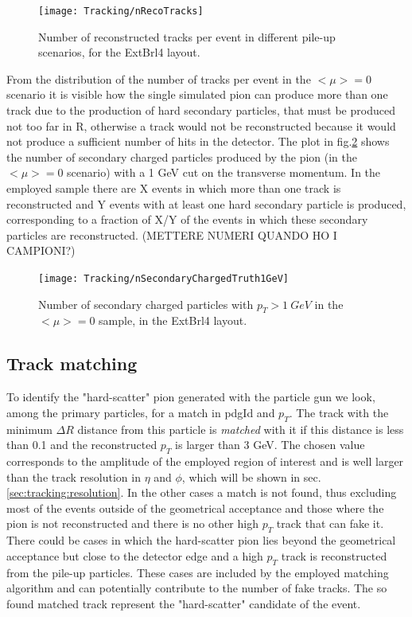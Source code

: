 \documentclass[a4paper,twoside,12pt]{article}
\begin{document}
\begin{figure}
\centering
\texttt{[image: Tracking/nRecoTracks]}
\caption{Number of reconstructed tracks per event in different pile-up scenarios, for the ExtBrl4 layout.}
\label{fig:tracking:nRecoTracks}
\end{figure}

From the distribution of the number of tracks per event in the $<\mu> = 0$ scenario it is visible
how the single simulated pion can produce more than one track due to the production of hard secondary particles, that must be produced not too far in R, otherwise a track would
not be reconstructed because it would not produce a sufficient number of hits in the detector. The plot in fig.\ref{fig:tracking:nSecondaryChargedTruth1GeV} shows the number of secondary charged particles produced by the pion (in the $<\mu> = 0$ scenario)
with a 1 GeV cut on the transverse momentum. In the employed sample there are X events in which more than one track is reconstructed and Y events with at least one hard secondary 
particle is produced, corresponding to a fraction of X/Y of the events in which these secondary particles are reconstructed. (METTERE NUMERI QUANDO HO I CAMPIONI?)

\begin{figure}
\centering
\texttt{[image: Tracking/nSecondaryChargedTruth1GeV]}
\caption{Number of secondary charged particles with $p_T > 1\ GeV$ in the $<\mu> = 0$ sample, in the ExtBrl4 layout.}
\label{fig:tracking:nSecondaryChargedTruth1GeV}
\end{figure}

\subsection{Track matching}\label{subsec:tracking:matching}
To identify the "hard-scatter" pion generated with the particle gun we look, among the primary particles, for a match in pdgId and $p_{T}$. The
track with the minimum $\Delta R$ distance from this particle is \textit{matched} with it if this distance is less than 0.1 and the reconstructed $p_{T}$ is 
larger than 3 GeV. The chosen value corresponds to the amplitude of the employed
region of interest and is well larger than the track resolution in $\eta$ and $\phi$, which will be shown in sec. \ref{sec:tracking:resolution}. In the other cases a match
is not found, thus excluding most of the events outside of the geometrical acceptance and those where the pion is not reconstructed and there is no other 
high $p_{T}$ track that can fake it. There could be cases in which the hard-scatter pion lies beyond the geometrical acceptance but close to the detector edge 
and a high $p_{T}$ track is reconstructed from the pile-up particles. These cases are included by the employed matching algorithm and can potentially contribute
to the number of fake tracks. The so found matched track
represent the "hard-scatter" candidate of the event.  
\end{document}

